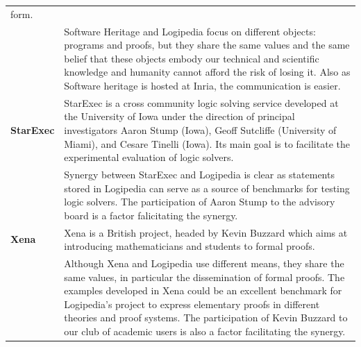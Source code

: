 \begin{longtable}{|p{}|p{}|}
form.\\
&
\hspace{0.4cm} Software Heritage and Logipedia focus on different
objects: programs and proofs, but they share the same values and the
same belief that these objects embody our technical and scientific
knowledge and humanity cannot afford the risk of losing it. Also as
Software heritage is hosted at Inria, the communication is easier.
\\
\hline
    {\bf StarExec} &
     StarExec is a cross community logic solving service developed at the University of Iowa under the direction of principal investigators Aaron Stump (Iowa), Geoff Sutcliffe (University of Miami), and Cesare Tinelli (Iowa).
Its main goal is to facilitate the experimental evaluation of logic solvers.\\
&
\hspace{0.4cm}
Synergy between StarExec and Logipedia is clear as statements stored in Logipedia can serve as a source of benchmarks for testing logic solvers.
The participation of Aaron Stump to the advisory board is a factor falicitating the synergy.
\\
\hline  
{\bf Xena} 
&
Xena is a British project, headed by Kevin Buzzard 
which aims at
introducing mathematicians and students
to formal proofs.\\
&
\hspace{0.4cm} Although Xena and Logipedia use different means, they
share the same values, in particular the dissemination of formal
proofs. The examples developed in Xena could be an excellent benchmark
for Logipedia's project to express elementary proofs in different theories
and proof systems. 
The participation of Kevin Buzzard to our club of academic users 
is also a factor facilitating the synergy.\\
\hline
\end{longtable}

